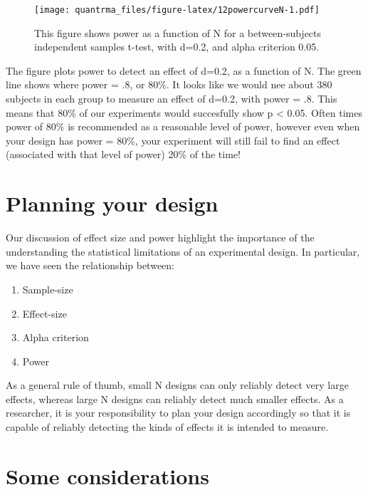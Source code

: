 \documentclass[
]{book}
\providecommand{\tightlist}{%
  \setlength{\itemsep}{0pt}\setlength{\parskip}{0pt}}
\begin{document}
\begin{figure}
\centering
\texttt{[image: quantrma\_files/figure-latex/12powercurveN-1.pdf]}
\caption{\label{fig:12powercurveN}This figure shows power as a function of N for a between-subjects independent samples t-test, with d=0.2, and alpha criterion 0.05.}
\end{figure}

The figure plots power to detect an effect of d=0.2, as a function of N. The green line shows where power = .8, or 80\%. It looks like we would nee about 380 subjects in each group to measure an effect of d=0.2, with power = .8. This means that 80\% of our experiments would succesfully show p \textless{} 0.05. Often times power of 80\% is recommended as a reasonable level of power, however even when your design has power = 80\%, your experiment will still fail to find an effect (associated with that level of power) 20\% of the time!

\hypertarget{planning-your-design}{%
\section{Planning your design}\label{planning-your-design}}

Our discussion of effect size and power highlight the importance of the understanding the statistical limitations of an experimental design. In particular, we have seen the relationship between:

\begin{enumerate}
\def\labelenumi{\arabic{enumi}.}
\tightlist
\item
  Sample-size
\item
  Effect-size
\item
  Alpha criterion
\item
  Power
\end{enumerate}

As a general rule of thumb, small N designs can only reliably detect very large effects, whereas large N designs can reliably detect much smaller effects. As a researcher, it is your responsibility to plan your design accordingly so that it is capable of reliably detecting the kinds of effects it is intended to measure.

\hypertarget{some-considerations}{%
\section{Some considerations}\label{some-considerations}}
\end{document}
